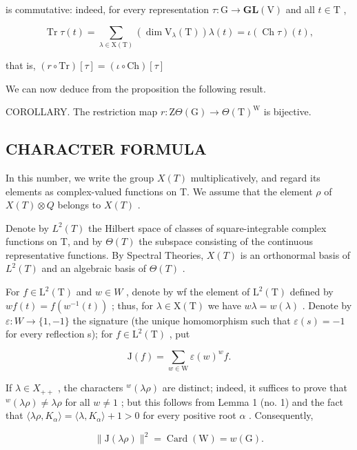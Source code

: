 is commutative: indeed, for every representation \(\tau : \mathrm{G} \to \mathbf{GL}(\mathrm{V})\) and all \(t \in \mathrm{T}\) ,

\[
\operatorname{Tr} \tau (t) = \sum_ {\lambda \in \mathrm{X} (\mathrm{T})} \left(\dim \mathrm{V} _ {\lambda} (\mathrm{T})\right) \lambda (t) = \iota (\operatorname{Ch} \tau) (t),
\]

that is, \((r\circ \mathrm{Tr})[\tau ] = (\iota \circ \mathrm{Ch})[\tau ]\)

We can now deduce from the proposition the following result.

COROLLARY. The restriction map \(r: \mathrm{Z}\Theta(\mathrm{G}) \to \Theta(\mathrm{T})^{\mathrm{W}}\) is bijective.

\subsection{CHARACTER FORMULA}

In this number, we write the group \(X(T)\) multiplicatively, and regard its elements as complex-valued functions on T. We assume that the element \(\rho\) of \(X(T) \otimes Q\) belongs to \(X(T)\) .

Denote by \(L^{2}(T)\) the Hilbert space of classes of square-integrable complex functions on T, and by \(\Theta(T)\) the subspace consisting of the continuous representative functions. By Spectral Theories, \(X(T)\) is an orthonormal basis of \(L^{2}(T)\) and an algebraic basis of \(\Theta(T)\) .

For \(f \in \mathrm{L}^{2}(\mathrm{T})\) and \(w \in W\) , denote by wf the element of \(\mathrm{L}^{2}(\mathrm{T})\) defined by \(wf(t) = f(w^{-1}(t))\) ; thus, for \(\lambda \in \mathrm{X}(\mathrm{T})\) we have \(w\lambda = w(\lambda)\) . Denote by \(\varepsilon : W \to \{1, -1\}\) the signature (the unique homomorphism such that \(\varepsilon(s) = -1\) for every reflection s); for \(f \in \mathrm{L}^{2}(\mathrm{T})\) , put

\[
\mathrm{J} (f) = \sum_ {w \in \mathrm{W}} \varepsilon (w) ^ {w} f.
\]

If \(\lambda \in X_{++}\) , the characters \(^w (\lambda \rho)\) are distinct; indeed, it suffices to prove that \(^w (\lambda \rho)\neq \lambda \rho\) for all \(w\neq 1\) ; but this follows from Lemma 1 (no. 1) and the fact that \(\langle \lambda \rho ,K_{\alpha}\rangle = \langle \lambda ,K_{\alpha}\rangle +1 > 0\) for every positive root \(\alpha\) . Consequently,

\[
\| \mathrm{J} (\lambda \rho) \| ^ {2} = \operatorname{Card} (\mathrm{W}) = w (\mathrm{G}).
\]

